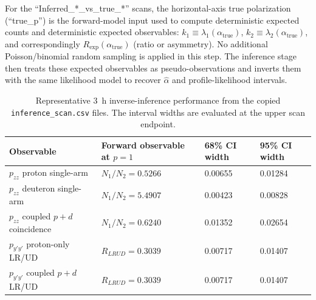 \documentclass[11pt,a4paper]{article}
\begin{document}
For the ``Inferred\_*\_vs\_true\_*'' scans, the horizontal-axis true polarization (``true\_p'') is the forward-model input used to compute deterministic expected counts and deterministic expected observables:
$k_1 \equiv \lambda_1(\alpha_{\mathrm{true}})$, $k_2 \equiv \lambda_2(\alpha_{\mathrm{true}})$, and correspondingly $R_{\mathrm{exp}}(\alpha_{\mathrm{true}})$ (ratio or asymmetry). No additional Poisson/binomial random sampling is applied in this step. The inference stage then treats these expected observables as pseudo-observations and inverts them with the same likelihood model to recover $\hat{\alpha}$ and profile-likelihood intervals.

\begin{table}[htbp]
    \centering
    \caption{Representative \SI{3}{h} inverse-inference performance from the copied \texttt{inference\_scan.csv} files. The interval widths are evaluated at the upper scan endpoint.}
    \label{tab:inference_summary}
    \small
    \begin{tabular}{llll}
        \hline
        Observable & Forward observable at $p=1$ & 68\% CI width & 95\% CI width \\
        \hline
        $p_{zz}$ proton single-arm & $N_1/N_2 = 0.5266$ & 0.00655 & 0.01284 \\
        $p_{zz}$ deuteron single-arm & $N_1/N_2 = 5.4907$ & 0.00423 & 0.00828 \\
        $p_{zz}$ coupled $p+d$ coincidence & $N_1/N_2 = 0.6240$ & 0.01352 & 0.02654 \\
        $p_{y'y'}$ proton-only LR/UD & $R_{LRUD} = 0.3039$ & 0.00717 & 0.01407 \\
        $p_{y'y'}$ coupled $p+d$ LR/UD & $R_{LRUD} = 0.3039$ & 0.00717 & 0.01407 \\
        \hline
    \end{tabular}
\end{table}
\end{document}
